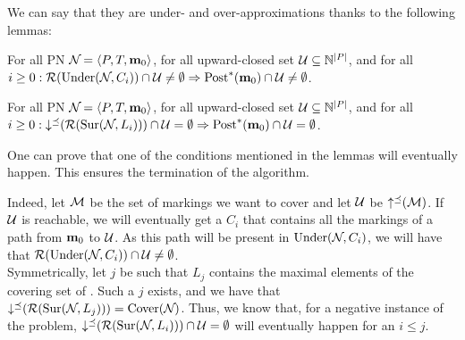 We can say that they are under- and over-approximations thanks to the following lemmas:
\begin{lemm}
  For all \ac{PN} $\defPN$, for all upward-closed set $\mathcal{U} \subseteq \mathbb{N}^{\left|P\right|}$, and for all $i \geq 0: \operatorname{\mathcal{R}}(\operatorname{Under}(\mathcal{N}_{},C_i)) \cap \mathcal{U} \neq \emptyset \Rightarrow \operatorname{Post}^*_{{}}(\mathbf{m}_0) \cap \mathcal{U} \neq \emptyset$.
\end{lemm}
\begin{lemm}
  For all \ac{PN} $\defPN$, for all upward-closed set $\mathcal{U} \subseteq \mathbb{N}^{\left|P\right|}$, and for all $i \geq 0: \operatorname{\downarrow^\preceq}(\operatorname{\mathcal{R}}(\operatorname{Sur}(\mathcal{N}_{},L_i))) \cap \mathcal{U} = \emptyset \Rightarrow \operatorname{Post}^*_{{}}(\mathbf{m}_0) \cap \mathcal{U} = \emptyset$.
\end{lemm}

One can prove that one of the conditions mentioned in the lemmas will eventually happen.
This ensures the termination of the algorithm.

Indeed, let $\mathcal{M}$ be the set of markings we want to cover and let $\mathcal{U}$ be $\operatorname{\uparrow^\preceq}(\mathcal{M})$.
If $\mathcal{U}$ is reachable, we will eventually get a $C_i$ that contains all the markings of a path from $\mathbf{m}_0$ to $\mathcal{U}$.
As this path will be present in $\operatorname{Under}(\mathcal{N}_{}, C_i)$, we will have that $\operatorname{\mathcal{R}}(\operatorname{Under}(\mathcal{N}_{},C_i)) \cap \mathcal{U} \neq \emptyset$.\\
Symmetrically, let $j$ be such that $L_j$ contains the maximal elements of the covering set of \namePN.
Such a $j$ exists, and we have that $\operatorname{\downarrow^\preceq}(\operatorname{\mathcal{R}}(\operatorname{Sur}(\mathcal{N}_{},L_j))) = \operatorname{Cover}(\mathcal{N}_{})$.
Thus, we know that, for a negative instance of the problem, $\operatorname{\downarrow^\preceq}(\operatorname{\mathcal{R}}(\operatorname{Sur}(\mathcal{N}_{},L_i))) \cap \mathcal{U} = \emptyset$ will eventually happen for an $i \leq j$.

